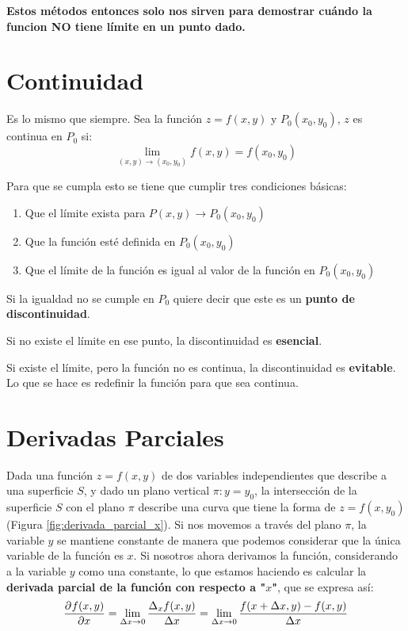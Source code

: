 \documentclass[12pt]{article}
\begin{document}
\textbf{Estos métodos entonces solo nos sirven para demostrar cuándo la funcion NO tiene límite en un punto dado.}

\section{Continuidad}
Es lo mismo que siempre. Sea la función $ z = f(x,y) $ y $ P_{0}(x_{0}, y_{0}) $, $ z $ es continua en $ P_{0} $ si:
\[
\lim_{(x,y) \to (x_{0},y_{0})}{f(x,y)} = f(x_{0},y_{0})
\]

Para que se cumpla esto se tiene que cumplir tres condiciones básicas:
\begin{enumerate}[1.]
  \item Que el límite exista para $ P(x,y) \to P_{0}(x_{0},y_{0}) $

  \item Que la función esté definida en $ P_{0}(x_{0},y_{0}) $

  \item Que el límite de la función es igual al valor de la función en $ P_{0}(x_{0},y_{0}) $
\end{enumerate}

Si la igualdad no se cumple en $ P_{0} $ quiere decir que este es un \textbf{punto de discontinuidad}.

Si no existe el límite en ese punto, la discontinuidad es \textbf{esencial}.

Si existe el límite, pero la función no es continua, la discontinuidad es \textbf{evitable}. Lo que se hace es redefinir la función para que sea continua.

\section{Derivadas Parciales}
Dada una función $ z = f(x,y) $ de dos variables independientes que describe a una superficie $ S $, y dado un plano vertical $ \pi:y=y_{0} $, la intersección de la superficie $ S $ con el plano $ \pi $ describe una curva que tiene la forma de $ z=f(x,y_{0}) $ (Figura \ref{fig:derivada_parcial_x}). Si nos movemos a través del plano $ \pi $, la variable $ y $ se mantiene constante de manera que podemos considerar que la única variable de la función es $ x $. Si nosotros ahora derivamos la función, considerando a la variable $ y $ como una constante, lo que estamos haciendo es calcular la \textbf{derivada parcial de la función con respecto a "$ x $"}, que se expresa así:
\[
\pdv[]{f(x,y)}{x} = \lim_{\Delta x \to 0}{\frac{\Delta_{x}f(x,y)}{\Delta x}} = \lim_{\Delta x \to 0}{\frac{f(x + \Delta x,y) - f(x,y)}{\Delta x}}
\]
\end{document}
